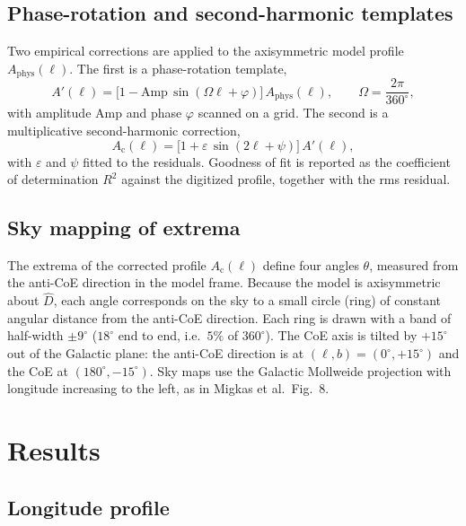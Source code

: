 \documentclass[11pt,letterpaper]{article}
\numberwithin{equation}{section}
\begin{document}
\subsection{Phase-rotation and second-harmonic templates}

Two empirical corrections are applied to the axisymmetric model profile
$A_{\mathrm{phys}}(\ell)$. The first is a phase-rotation template,
\begin{equation}
  A'(\ell) = \bigl[1-\mathrm{Amp}\,\sin(\Omega\ell+\varphi)\bigr]\,A_{\mathrm{phys}}(\ell),
  \qquad \Omega=\frac{2\pi}{360^\circ},
  \label{eq:ampsin}
\end{equation}
with amplitude $\mathrm{Amp}$ and phase $\varphi$ scanned on a grid. The second
is a multiplicative second-harmonic correction,
\begin{equation}
  A_{\mathrm{c}}(\ell) = \bigl[1+\varepsilon\,\sin(2\ell+\psi)\bigr]\,A'(\ell),
  \label{eq:2ell}
\end{equation}
with $\varepsilon$ and $\psi$ fitted to the residuals. Goodness of fit is
reported as the coefficient of determination $R^2$ against the digitized
profile, together with the rms residual.

\subsection{Sky mapping of extrema}

The extrema of the corrected profile $A_{\mathrm{c}}(\ell)$ define four angles
$\theta$, measured from the anti-CoE direction in the model frame. Because the
model is axisymmetric about $\hat D$, each angle corresponds on the sky to a
small circle (ring) of constant angular distance from the anti-CoE direction.
Each ring is drawn with a band of half-width $\pm9^\circ$ ($18^\circ$ end to end,
i.e.\ $5\%$ of $360^\circ$). The CoE axis is tilted by $+15^\circ$ out of the
Galactic plane: the anti-CoE direction is at $(\ell,b)=(0^\circ,+15^\circ)$ and the
CoE at $(180^\circ,-15^\circ)$. Sky maps use the Galactic Mollweide projection with
longitude increasing to the left, as in Migkas et al.\ Fig.~8.

\section{Results}
\label{sec:results}

\subsection{Longitude profile}
\end{document}

